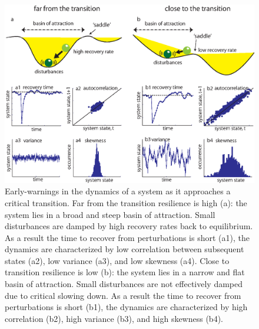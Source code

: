 \documentclass[12pt,a4paper,final]{article}
\begin{document}
\begin{doublespacing}
\begin{figure}[h]
\begin{center}
\includegraphics[scale=0.8]{figure1.eps}
\caption{Early-warnings in the dynamics of a system as it approaches a critical transition. Far from the transition resilience is high (a): the system lies in a broad and steep basin of attraction. Small disturbances are damped by high recovery rates back to equilibrium. As a result the time to recover from perturbations is short (a1), the dynamics are characterized by low correlation between subsequent states (a2), low variance (a3), and low skewness (a4). Close to transition resilience is low (b): the system lies in a narrow and flat basin of attraction. Small disturbances are not effectively damped due to critical slowing down. As a result the time to recover from perturbations is short (b1), the dynamics are characterized by high correlation (b2), high variance (b3), and high skewness (b4).}
\end{center}
\label{fig:ews_theory}
\end{figure}


\end{doublespacing}
\end{document}
